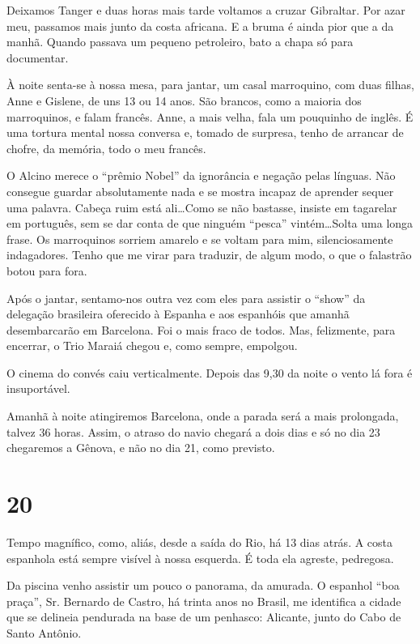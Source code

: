 Deixamos Tanger e duas horas mais tarde voltamos a cruzar Gibraltar. Por azar meu, passamos mais junto da costa africana. E a bruma é ainda pior que a da manhã. Quando passava um pequeno petroleiro, bato a chapa só para documentar.

À noite senta-se à nossa mesa, para jantar, um casal marroquino, com duas filhas, Anne e Gislene, de uns 13 ou 14 anos. São brancos, como a maioria dos marroquinos, e falam francês. Anne, a mais velha, fala um pouquinho de inglês. É uma tortura mental nossa conversa e, tomado de surpresa, tenho de arrancar de chofre, da memória, todo o meu francês.

O Alcino merece o “prêmio Nobel” da ignorância e negação pelas línguas. Não consegue guardar absolutamente nada e se mostra incapaz de aprender sequer uma palavra. Cabeça ruim está ali\ldots Como se não bastasse, insiste em tagarelar em português, sem se dar conta de que ninguém “pesca” vintém\ldots Solta uma longa frase. Os marroquinos sorriem amarelo e se voltam para mim, silenciosamente indagadores. Tenho que me virar para traduzir, de algum modo, o que o falastrão botou para fora.

Após o jantar, sentamo-nos outra vez com eles para assistir o “show” da delegação brasileira oferecido à Espanha e aos espanhóis que amanhã desembarcarão em Barcelona. Foi o mais fraco de todos. Mas, felizmente, para encerrar, o Trio Maraiá chegou e, como sempre, empolgou.

O cinema do convés caiu verticalmente. Depois das 9,30 da noite o vento lá fora é insuportável.

Amanhã à noite atingiremos Barcelona, onde a parada será a mais prolongada, talvez 36 horas. Assim, o atraso do navio chegará a dois dias e só no dia 23 chegaremos a Gênova, e não no dia 21, como previsto.

\section*{20 \adfflatleafright {}}

Tempo magnífico, como, aliás, desde a saída do Rio, há 13 dias atrás. A costa espanhola está sempre visível à nossa esquerda. É toda ela agreste, pedregosa.

Da piscina venho assistir um pouco o panorama, da amurada. O espanhol “boa praça”, Sr. Bernardo de Castro, há trinta anos no Brasil, me identifica a cidade que se delineia pendurada na base de um penhasco: Alicante, junto do Cabo de Santo Antônio.

